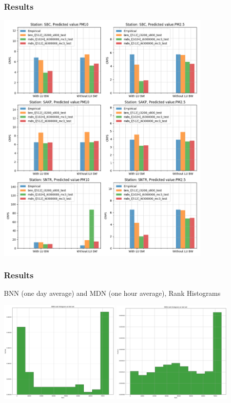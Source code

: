 \documentclass[18pt]{beamer}
\begin{document}
\begin{frame}
  \frametitle{Results}
  \begin{center}
    \vspace*{-0.2in}
    \includegraphics[height=0.65\textwidth, width=0.8\textwidth ]{images/1h/results_plot_CRPS}
  \end{center}
\end{frame}

\begin{frame}
  \frametitle{Results}
  BNN (one day average) and MDN (one hour average), Rank Histograms
  
  \begin{center}
      \includegraphics[height=0.45\textwidth, width=0.45\textwidth ]{images/ver/bnn-rank-1d}
      \includegraphics[height=0.45\textwidth, width=0.45\textwidth ]{images/ver/mdn-rank-1h}
  \end{center}
  
\end{frame}
\end{document}
